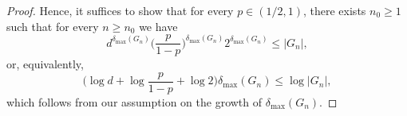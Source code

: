 \documentclass[10pt,a4paper]{amsart}
\begin{document}
\begin{proof}
Hence, it suffices to show that  for every $p\in (1/2,1)$, there exists $n_0\geq 1$ such that for every $n\geq n_0$ we have
\begin{equation}
d^{\delta_\mathrm{max}(G_n)}\Big(\frac{p}{1-p}\Big)^{\delta_\mathrm{max}(G_n)}2^{\delta_\mathrm{max}(G_n)}\leq |G_n|,
\end{equation}
or, equivalently,
\begin{equation}
\Big(\log d+ \log \frac{p}{1-p}+\log 2\Big)
  \delta_\mathrm{max}(G_n)\leq \log |G_n|,
\end{equation}
which follows from our assumption on the growth of $\delta_\mathrm{max}(G_n)$.
\end{proof}
\end{document}
